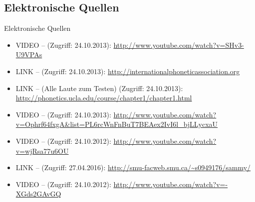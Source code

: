 \subsection{Elektronische Quellen}

\begin{frame}[allowframebreaks]{Elektronische Quellen}
	\small
	
	\begin{itemize}
		\item VIDEO --  (Zugriff: 24.10.2013): \url{http://www.youtube.com/watch?v=SHv3-U9VPAs}
		\item LINK --  (Zugriff: 24.10.2013): \url{http://internationalphoneticassociation.org}
		\item LINK --  (Alle Laute zum Testen) (Zugriff: 24.10.2013):\\ \url{http://phonetics.ucla.edu/course/chapter1/chapter1.html}
		\item VIDEO --  (Zugriff: 24.10.2013): \url{http://www.youtube.com/watch?v=Ophrf64fxgA&list=PL6rcWnFnBuT7BEAex2IvI6l_bjLLycxaU}
		\item VIDEO --  (Zugriff: 24.10.2012): \url{http://www.youtube.com/watch?v=wjRsa77u6OU}
		\item LINK --  (Zugriff: 27.04.2016): \url{http://smu-facweb.smu.ca/~s0949176/sammy/}
		\item VIDEO --  (Zugriff: 24.10.2012): \url{http://www.youtube.com/watch?v=-XGds2GAvGQ}
	\end{itemize}
	
\end{frame}


